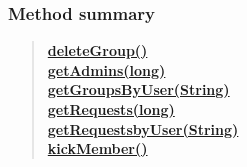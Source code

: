 \documentclass[11pt,a4paper]{report}
\begin{document}
{{{{{{{\subsubsection{Method summary}{
\begin{verse}
\hyperlink{edu.kit.pse17.go_app.PersistenceLayer.daos.GroupDao.deleteGroup()}{{\bf deleteGroup()}} \\
\hyperlink{edu.kit.pse17.go_app.PersistenceLayer.daos.GroupDao.getAdmins(long)}{{\bf getAdmins(long)}} \\
\hyperlink{edu.kit.pse17.go_app.PersistenceLayer.daos.GroupDao.getGroupsByUser(java.lang.String)}{{\bf getGroupsByUser(String)}} \\
\hyperlink{edu.kit.pse17.go_app.PersistenceLayer.daos.GroupDao.getRequests(long)}{{\bf getRequests(long)}} \\
\hyperlink{edu.kit.pse17.go_app.PersistenceLayer.daos.GroupDao.getRequestsbyUser(java.lang.String)}{{\bf getRequestsbyUser(String)}} \\
\hyperlink{edu.kit.pse17.go_app.PersistenceLayer.daos.GroupDao.kickMember()}{{\bf kickMember()}} \\
\end{verse}
}
}}}}}}}
\end{document}
